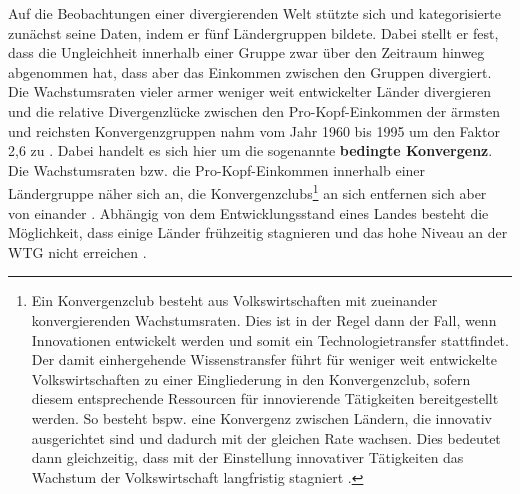 Auf die Beobachtungen einer divergierenden Welt st{\"u}tzte sich \citet{MayerFoulkes.2006} und kategorisierte zun{\"a}chst seine Daten, indem er f{\"u}nf L{\"a}ndergruppen bildete. Dabei stellt er fest, dass die Ungleichheit innerhalb einer Gruppe zwar {\"u}ber den Zeitraum hinweg abgenommen hat, dass aber das Einkommen zwischen den Gruppen divergiert. Die Wachstumsraten vieler armer weniger weit entwickelter L{\"a}nder divergieren und die relative Divergenzl{\"u}cke zwischen den Pro-Kopf-Einkommen der {\"a}rmsten und reichsten Konvergenzgruppen nahm vom Jahr 1960 bis 1995 um den Faktor 2,6 zu \citep{MayerFoulkes.2006}. Dabei handelt es sich hier um die sogenannte \textbf{bedingte Konvergenz}. Die Wachstumsraten bzw. die Pro-Kopf-Einkommen innerhalb einer L{\"a}ndergruppe n{\"a}her sich an, die Konvergenzclubs\footnote{Ein Konvergenzclub besteht aus Volkswirtschaften mit zueinander konvergierenden Wachstumsraten. Dies ist in der Regel dann der Fall, wenn Innovationen entwickelt werden und somit ein Technologietransfer stattfindet. Der damit einhergehende Wissenstransfer f{\"u}hrt f{\"u}r weniger weit entwickelte Volkswirtschaften zu einer Eingliederung in den Konvergenzclub, sofern diesem entsprechende Ressourcen f{\"u}r innovierende T{\"a}tigkeiten bereitgestellt werden. So besteht bspw. eine Konvergenz zwischen L{\"a}ndern, die innovativ ausgerichtet sind und dadurch mit der gleichen Rate wachsen. Dies bedeutet dann gleichzeitig, dass mit der Einstellung innovativer T{\"a}tigkeiten das Wachstum der Volkswirtschaft langfristig stagniert \citep{Aghion.2015}.} an sich entfernen sich aber von einander \citep{Quah.1993,Howitt.2000,Howitt.2005}. Abh{\"a}ngig von dem Entwicklungsstand eines Landes besteht die M{\"o}glichkeit, dass einige L{\"a}nder fr{\"u}hzeitig stagnieren und das hohe Niveau an der WTG nicht erreichen \citep{Aghion.1992,Barro.1997,Howitt.2005}.\\

